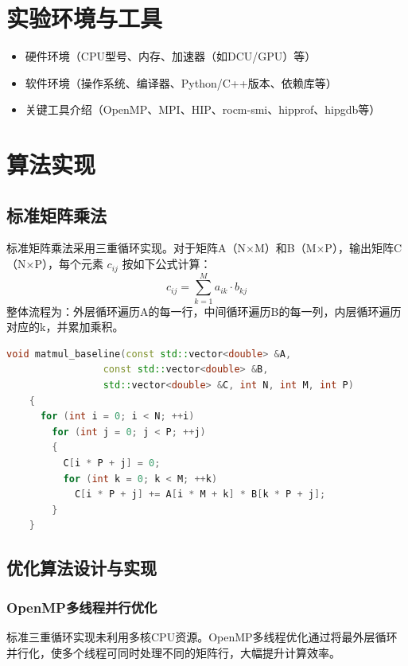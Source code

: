 \documentclass[UTF8,a4paper,10pt]{ctexart}
\begin{document}

\section{实验环境与工具}
\begin{itemize}
    \item 硬件环境（CPU型号、内存、加速器（如DCU/GPU）等）
    \item 软件环境（操作系统、编译器、Python/C++版本、依赖库等）
    \item 关键工具介绍（OpenMP、MPI、HIP、rocm-smi、hipprof、hipgdb等）
\end{itemize}
\section{算法实现}

\subsection{标准矩阵乘法}

标准矩阵乘法采用三重循环实现。对于矩阵A（N×M）和B（M×P），输出矩阵C（N×P），每个元素 $c_{ij}$ 按如下公式计算：
        $$
        c_{ij} = \sum_{k=1}^{M} a_{ik} \cdot b_{kj}
        $$
整体流程为：外层循环遍历A的每一行，中间循环遍历B的每一列，内层循环遍历对应的k，并累加乘积。


\begin{lstlisting}[title=标准矩阵乘法,frame=trbl,language={C++}]
    void matmul_baseline(const std::vector<double> &A,
                 const std::vector<double> &B,
                 std::vector<double> &C, int N, int M, int P)
    {
      for (int i = 0; i < N; ++i)
        for (int j = 0; j < P; ++j)
        {
          C[i * P + j] = 0;
          for (int k = 0; k < M; ++k)
            C[i * P + j] += A[i * M + k] * B[k * P + j];
        }
    }
\end{lstlisting}


\subsection{优化算法设计与实现}

\subsubsection{OpenMP多线程并行优化}
标准三重循环实现未利用多核CPU资源。OpenMP多线程优化通过将最外层循环并行化，使多个线程可同时处理不同的矩阵行，大幅提升计算效率。
\end{document}

